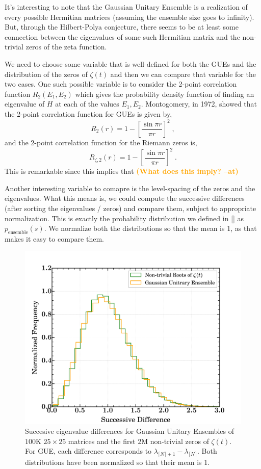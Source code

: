 \documentclass{amsproc}
\newcommand{\at}[1]{\textbf{\textcolor{orange}{(#1 --at)}}}
\theoremstyle{definition}
\theoremstyle{remark}
\numberwithin{equation}{section}
\begin{document}
It's interesting to note that the Gaussian Unitary Ensemble is a realization of every possible Hermitian matrices (assuming the ensemble size goes to infinity). But, through the Hilbert-Polya conjecture, there seems to be at least some connection between the eigenvalues of some such Hermitian matrix and the non-trivial zeros of the zeta function. 

We need to choose some variable that is well-defined for both the GUEs and the distribution of the zeros of $\zeta(t)$ and then we can compare that variable for the two cases. One such possible variable is to consider the 2-point correlation function $R_2(E_1, E_2)$ which gives the probability density function of finding an eigenvalue of $H$ at each of the values $E_1, E_2$.  Montogomery, in 1972, showed that the 2-point correlation function for GUEs is given by,
$$
R_2(r) = 1 - \left[ \frac{ \sin{\pi r} }{\pi r} \right]^2 \;,
$$
and the 2-point correlation function for the Riemann zeros is, 
$$
R_{\zeta, 2}(r) = 1 - \left[ \frac{ \sin{\pi r} }{\pi r} \right]^2 \;.
$$
This is remarkable since this implies that \at{What does this imply?}

Another interesting variable to comapre is the level-spacing of the zeros and the eigenvalues. What this means is, we could compute the successive differences (after sorting the eigenvalues / zeros) and compare them, subject to appropriate normalization. This is exactly the probability distribution we defined in \ref{} as $p_{\mathrm{ensemble}}(s)$. We normalize both the distributions so that the mean is 1, as that makes it easy to compare them. 

\begin{figure}
\includegraphics[width=\columnwidth]{figures/GUE_eigenvalues_and_zeros_differences.pdf}
\caption{Succesive eigenvalue differences for Gaussian Unitary Ensembles of $100\mathrm{K}$ $25 \times 25$ matrices and the first 2M non-trivial zeros of $\zeta(t)$. For GUE, each difference corresponds to $\lambda_{\lceil N \rceil + 1} - \lambda_{ \lceil N \rceil}$. Both distributions have been normalized so that their mean is 1. }
\label{fig:random_matrices_eigenvalues_differences}
\end{figure}
\end{document}
